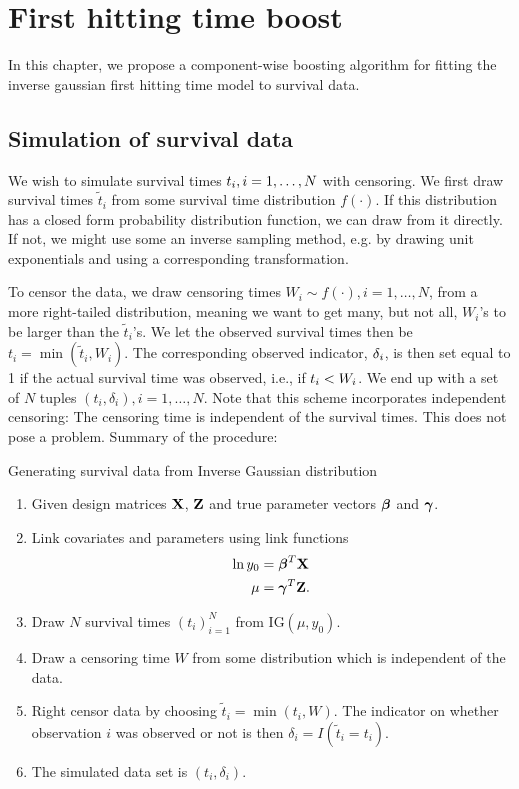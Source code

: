 \chapter{First hitting time boost}
In this chapter, we propose a component-wise boosting algorithm for fitting the inverse gaussian first hitting time model to survival data.

\section{Simulation of survival data}
We wish to simulate survival times $t_{i},i=1,\ldots,N$ with censoring. We first draw survival times $\tilde{t}_i$ from some survival time distribution $f(\cdot)$. If this distribution has a closed form probability distribution function, we can draw from it directly. If not, we might use some an inverse sampling method, e.g. by drawing unit exponentials and using a corresponding transformation.

To censor the data, we draw censoring times $W_i\sim f(\cdot),i=1,\ldots,N$, from a more right-tailed distribution, meaning we want to get many, but not all, $W_i$'s to be larger than the $\tilde{t}_i$'s. We let the observed survival times then be $t_i=\min(\tilde{t}_i,W_i)$.
The corresponding observed indicator, $\delta_{i}$, is then set equal to 1 if the actual survival time was observed, i.e., if $t_{i}<W_i$. We end up with a set of $N$ tuples $(t_i,\delta_i),i=1,\ldots,N$. Note that this scheme incorporates independent censoring: The censoring time is independent of the survival times. This does not pose a problem. Summary of the procedure:

\begin{algorithm}
\caption{Generating survival data from Inverse Gaussian distribution}
\label{algo:FHT-sim}
\begin{enumerate}
    \item Given design matrices $\mathbf{X}$, $\mathbf{Z}$ and true parameter vectors $\boldsymbol{\beta}$ and $\boldsymbol{\gamma}$.
    \item Link covariates and parameters using link functions
        \begin{align*}
            \ln y_0&=\boldsymbol{\beta}^T\mathbf{X} \\
            \mu&=\boldsymbol{\gamma}^T\mathbf{Z}.
        \end{align*}
    \item Draw $N$ survival times $(t_i)_{i=1}^N$ from IG$(\mu,y_0)$.
    \item Draw a censoring time $W$ from some distribution which is independent of the data.
    \item Right censor data by choosing $\widetilde{t}_i=\min(t_i,W)$. The indicator on whether observation $i$ was observed or not is then $\delta_i=I(\widetilde{t}_i=t_i)$.
    \item The simulated data set is $(t_i,\delta_i)$.
\end{enumerate}
\end{algorithm}


